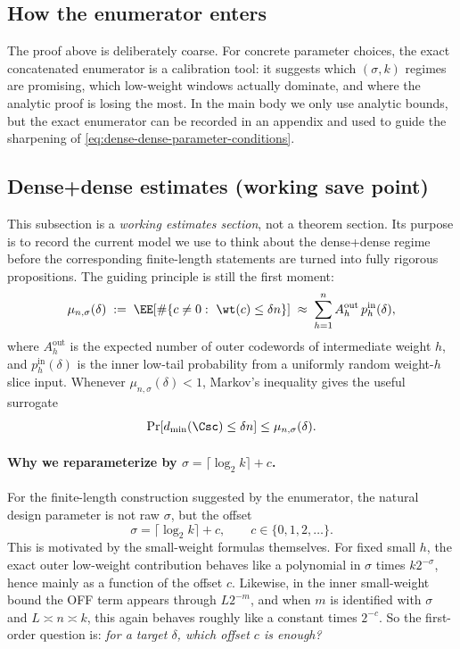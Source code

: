 \subsection{How the enumerator enters}
\label{sec:integration-dense-dense-enumerator}

The proof above is deliberately coarse.
For concrete parameter choices, the exact concatenated enumerator is a calibration tool:
it suggests which \((\sigma,k)\) regimes are promising, which low-weight windows actually dominate,
and where the analytic proof is losing the most.
In the main body we only use analytic bounds, but the exact enumerator can be recorded in an appendix and used to guide
the sharpening of \eqref{eq:dense-dense-parameter-conditions}.

\subsection{Dense+dense estimates (working save point)}
\label{sec:integration-dense-dense-estimates}

This subsection is a \emph{working estimates section}, not a theorem section.
Its purpose is to record the current model we use to think about the dense+dense regime before the corresponding
finite-length statements are turned into fully rigorous propositions.
The guiding principle is still the first moment:
\begin{equation}
\label{eq:dense-dense-working-mu}
\mu_{n,\sigma}(\delta)
\;:=\;
\EE\!\left[\#\{c\neq 0:\ \wt(c)\le \delta n\}\right]
\;\approx\;
\sum_{h=1}^{n}
A_h^{\mathrm{out}}\,
p_h^{\mathrm{in}}(\delta),
\end{equation}
where \(A_h^{\mathrm{out}}\) is the expected number of outer codewords of intermediate weight \(h\), and
\(p_h^{\mathrm{in}}(\delta)\) is the inner low-tail probability from a uniformly random weight-\(h\) slice input.
Whenever \(\mu_{n,\sigma}(\delta)<1\), Markov's inequality gives the useful surrogate
\[
\Pr[d_{\min}(\Csc)\le \delta n]\le \mu_{n,\sigma}(\delta).
\]

\paragraph{Why we reparameterize by \(\sigma=\lceil \log_2 k\rceil+c\).}
For the finite-length construction suggested by the enumerator, the natural design parameter is not raw \(\sigma\), but
the offset
\[
\sigma=\lceil \log_2 k\rceil+c,
\qquad c\in\{0,1,2,\dots\}.
\]
This is motivated by the small-weight formulas themselves.
For fixed small \(h\), the exact outer low-weight contribution behaves like a polynomial in \(\sigma\) times
\(k2^{-\sigma}\), hence mainly as a function of the offset \(c\).
Likewise, in the inner small-weight bound the OFF term appears through \(L2^{-m}\), and when \(m\) is identified with
\(\sigma\) and \(L\asymp n\asymp k\), this again behaves roughly like a constant times \(2^{-c}\).
So the first-order question is:
\emph{for a target \(\delta\), which offset \(c\) is enough?}

